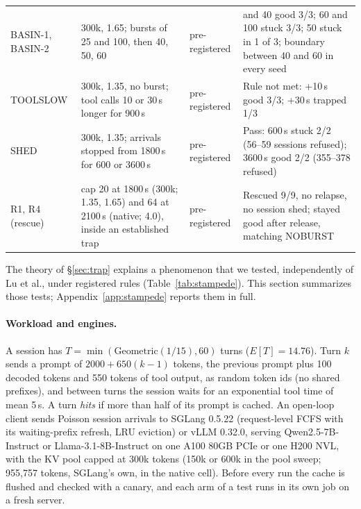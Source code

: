 \begin{table}[t]
\begin{tabular}{@{}>{\raggedright\arraybackslash}p{2.4cm} >{\raggedright\arraybackslash}p{5.3cm} >{\raggedright\arraybackslash}p{1.9cm} >{\raggedright\arraybackslash}p{7.5cm}@{}}
\addlinespace
BASIN-1, BASIN-2 & 300k, 1.65; bursts of 25 and 100, then 40, 50, 60 & pre-registered & 25 and 40 good 3/3; 60 and 100 stuck 3/3; 50 stuck in 1 of 3; boundary between 40 and 60 in every seed\\
TOOLSLOW & 300k, 1.35, no burst; tool calls 10 or 30\,s longer for 900\,s & pre-registered & Rule not met: +10\,s good 3/3; +30\,s trapped 1/3\\
SHED & 300k, 1.35; arrivals stopped from 1800\,s for 600 or 3600\,s & pre-registered & Pass: 600\,s stuck 2/2 (56--59 sessions refused); 3600\,s good 2/2 (355--378 refused)\\
R1, R4 (rescue) & cap 20 at 1800\,s (300k; 1.35, 1.65) and 64 at 2100\,s (native; 4.0), inside an established trap & pre-registered & Rescued 9/9, no relapse, no session shed; stayed good after release, matching NOBURST\\
\bottomrule
\end{tabular}
\end{table}

The theory of \S\ref{sec:trap} explains a phenomenon that we tested, independently of Lu et al., under registered rules
(Table~\ref{tab:stampede}). This section summarizes those tests; Appendix~\ref{app:stampede} reports them in full.

\paragraph{Workload and engines.} A session has $T=\min(\mathrm{Geometric}(1/15),60)$ turns ($E[T]=14.76$). Turn $k$ sends a
prompt of $2000+650(k-1)$ tokens, the previous prompt plus 100 decoded tokens and 550 tokens of tool output, as random token ids
(no shared prefixes), and between turns the session waits for an exponential tool time of mean 5\,s. A turn \emph{hits} if more
than half of its prompt is cached. An open-loop client sends Poisson session arrivals to SGLang 0.5.22 (request-level FCFS with its
waiting-prefix refresh, LRU eviction) or vLLM 0.32.0, serving Qwen2.5-7B-Instruct or Llama-3.1-8B-Instruct on one A100 80GB PCIe or
one H200 NVL, with the KV pool capped at 300k tokens (150k or 600k in the pool sweep; 955,757 tokens, SGLang's own, in the native
cell). Before every run the cache is flushed and checked with a canary, and each arm of a test runs in its own job on a fresh
server.

